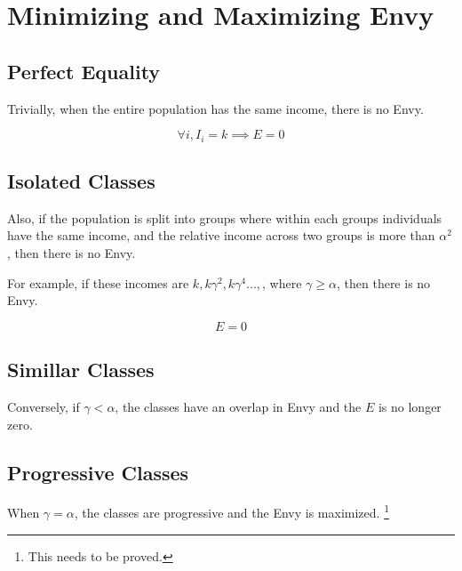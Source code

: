 \section {Minimizing and Maximizing Envy}

\subsection {Perfect Equality}

Trivially, when the entire population has the same income, there is no Envy. 

\begin{equation}
    \forall i,  I_i = k \implies E = 0
\end{equation}


\subsection {Isolated Classes}

Also, if the population is split into groups where within each groups individuals have the same income, and the relative income across two groups is more than $\alpha^2$, then there is no Envy.

For example, if these incomes are $k, k\gamma^2, k\gamma^4...,$, where $\gamma \ge \alpha$, then there is no Envy.

\begin{equation}
    E = 0
\end{equation}

\subsection {Simillar Classes}

Conversely, if $\gamma < \alpha$, the classes have an overlap in Envy and the ${E}$ is no longer zero.

\subsection {Progressive Classes}

When $\gamma = \alpha$, the classes are progressive and the Envy is maximized. \footnote{This needs to be proved.}